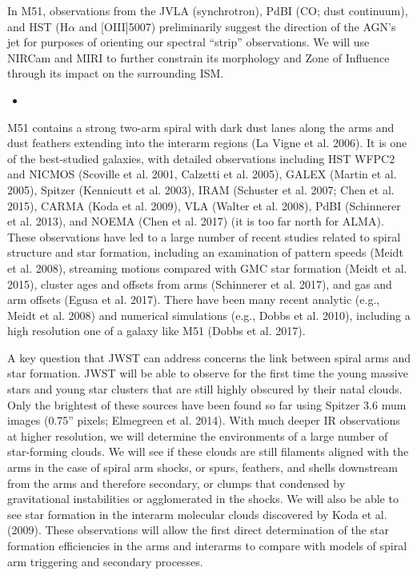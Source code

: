 \documentclass[12pt]{article}
\begin{document}
In M51, observations from the JVLA (synchrotron), PdBI (CO; dust continuum), and HST (H$\alpha$ and [OIII]5007) preliminarily suggest the direction of the AGN's jet for purposes of orienting our spectral ``strip'' observations.  We will use NIRCam and MIRI to further constrain its morphology and Zone of Influence through its impact on the surrounding ISM. 

\vspace{0.1in}


\begin{itemize}
    \item{}
\end{itemize}


M51 contains a strong two-arm spiral with dark dust lanes along the arms and dust feathers extending into the interarm regions (La Vigne et al. 2006). It is one of the best-studied galaxies, with detailed observations including HST WFPC2 and NICMOS (Scoville et al. 2001, Calzetti et al. 2005), GALEX (Martin et al. 2005), Spitzer (Kennicutt et al. 2003), IRAM (Schuster et al. 2007; Chen et al. 2015), CARMA (Koda et al. 2009), VLA (Walter et al. 2008), PdBI (Schinnerer et al. 2013), and NOEMA (Chen et al. 2017) (it is too far north for ALMA). These observations have led to a large number of recent studies related to spiral structure and star formation, including an examination of pattern speeds (Meidt et al. 2008), streaming motions compared with GMC star formation (Meidt et al. 2015), cluster ages and offsets from arms (Schinnerer et al. 2017), and gas and arm offsets (Egusa et al. 2017). There have been many recent analytic (e.g., Meidt et al. 2008) and numerical simulations (e.g., Dobbs et al. 2010), including a high resolution one of a galaxy like M51 (Dobbs et al. 2017).  
 
A key question that JWST can address concerns the link between spiral arms and star formation.  JWST will be able to observe for the first time the young massive stars and young star clusters that are still highly obscured by their natal clouds. Only the brightest of these sources have been found so far using Spitzer 3.6 mum images (0.75” pixels; Elmegreen et al. 2014). With much deeper IR observations at higher resolution, we will determine the environments of a large number of star-forming clouds. We will see if these clouds are still filaments aligned with the arms in the case of spiral arm shocks, or spurs, feathers, and shells downstream from the arms and therefore secondary, or clumps that condensed by gravitational instabilities or agglomerated in the shocks. We will also be able to see star formation in the interarm molecular clouds discovered by Koda et al. (2009).  These observations will allow the first direct determination of the star formation efficiencies in the arms and interarms to compare with models of spiral arm triggering and secondary processes.
 
\end{document}
